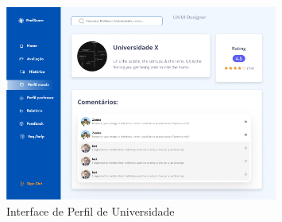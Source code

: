 \documentclass[12pt]{article}
\begin{document}
\begin{figure}[H] %
  \centering
  \includegraphics[width=0.8\textwidth]{interfaces/i12-perfil-univ.png}
  \caption{Interface de Perfil de Universidade}
  \label{fig:i12-perfil-univ}
\end{figure}
\end{document}
